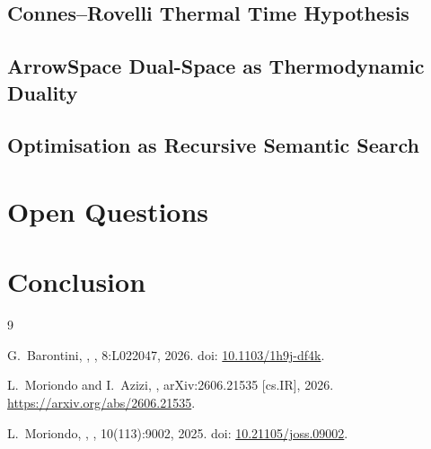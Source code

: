 \documentclass[11pt]{article}
\begin{document}
  \subsection{Connes--Rovelli Thermal Time Hypothesis}
  \label{sec:connes_rovelli}

  \subsection{ArrowSpace Dual-Space as Thermodynamic Duality}
  \label{sec:duality}

  \subsection{Optimisation as Recursive Semantic Search}
  \label{sec:recursive_search}

\section{Open Questions}
\label{sec:open_questions}

\section{Conclusion}
\label{sec:conclusion}

\newpage
\begin{thebibliography}{9}

G.~Barontini,
,
, 8:L022047, 2026.
\newblock doi: \href{https://doi.org/10.1103/1h9j-df4k}{10.1103/1h9j-df4k}.

L.~Moriondo and I.~Azizi,
,
\newblock arXiv:2606.21535 [cs.IR], 2026.
\newblock \href{https://arxiv.org/abs/2606.21535}{https://arxiv.org/abs/2606.21535}.

L.~Moriondo,
,
, 10(113):9002, 2025.
\newblock doi: \href{https://doi.org/10.21105/joss.09002}{10.21105/joss.09002}.

\end{thebibliography}
\end{document}

